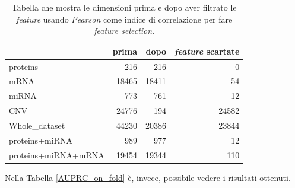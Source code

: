 \documentclass[12pt,italian]{report}
\begin{document}
	\begin{table}[h]
		\begin{center}
			\begin{adjustbox}{max width=\textwidth}
				\begin{tabular}{lrrr}
					\toprule
					{} &    prima &  dopo & \textit{feature} scartate\\
					\midrule
					proteins & 216 &216 &0 \\
					mRNA & 18465 & 18411 & 54\\
					miRNA  & 773 & 761 & 12\\
					CNV & 24776 & 194 & 24582 \\
					Whole\_dataset & 44230 & 20386 & 23844\\ 
					proteins+miRNA &989 & 977 & 12 \\
					proteins+miRNA+mRNA & 19454 & 19344 & 110\\
					\bottomrule
				\end{tabular}
			\end{adjustbox}
		\end{center}
		\caption{Tabella che mostra le dimensioni prima e dopo aver filtrato le \textit{feature} usando \textit{Pearson} come indice di correlazione per fare \textit{feature selection}.}
		\label{dimPostPearson}
	\end{table}
	Nella Tabella \ref{AUPRC_on_fold} è, invece, possibile vedere i risultati ottenuti.
	
\end{document}
